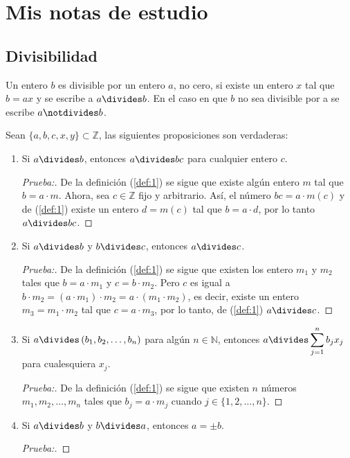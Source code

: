 \chapter*{Mis notas de estudio}
\section*{Divisibilidad}

\begin{definition}
Un entero $b$ es divisible por un entero $a$, no cero, si existe un entero $x$ tal que $b=ax$ y se escribe a $a\divides b$. En el caso en que $b$ no sea divisible por a se escribe $a\notdivides b$.
\end{definition}

\begin{theorem}
\noindent
Sean $\{a,b,c,x,y\}\subset\mathbb{Z}$, las siguientes proposiciones son verdaderas:
\begin{enumerate}[font={\bfseries},label={1)}]\label{def:1}
	\item Si $a\divides b$, entonces $a\divides bc$ para cualquier entero $c$.
	
	\begin{proof}[Prueba:]
	\noindent
	
	De la definición (\ref{def:1}) se sigue que existe algún entero $m$ tal que $b=a\cdot m$. Ahora, sea $c\in\mathbb{Z}$ fijo y arbitrario. Así, el número $bc=a\cdot m(c)$ y de (\ref{def:1}) existe un entero $d=m(c)$ tal que $b=a\cdot d$, por lo tanto $a\divides bc$.
	\end{proof}

	\item Si $a\divides b$ y $b\divides c$, entonces $a\divides c$.
	
	\begin{proof}[Prueba:]
	\noindent
	
	De la definición (\ref{def:1}) se sigue que existen los entero $m_1$ y $m_2$ tales que $b=a\cdot m_1$ y $c=b\cdot m_2$. Pero $c$ es igual a $b\cdot m_2=(a\cdot m_1)\cdot m_2=a\cdot(m_1\cdot m_2)$, es decir, existe un entero $m_3=m_1\cdot m_2$ tal que $c=a\cdot m_3$, por lo tanto, de (\ref{def:1}) $a\divides c$. 
	\end{proof}

	\item Si $a\divides \left(b_1,b_2,\ldots,b_n\right)$ para algún $n\in\mathbb{N}$, entonces $a\divides \displaystyle\sum_{j=1}^{n}b_jx_j$ para cualesquiera $x_j$.
	
	\begin{proof}[Prueba:]
	\noindent
	
	De la definición (\ref{def:1}) se sigue que existen $n$ números $m_1,m_2,\ldots, m_n$ tales que $b_j=a\cdot m_j$ cuando $j\in\{1,2,\ldots,n\}$.
	\end{proof}

	\item Si $a\divides b$ y $b\divides a$, entonces $a=\pm b$.
	
	\begin{proof}[Prueba:]
	\noindent
	
	\end{proof}
\end{enumerate}
\end{theorem}
